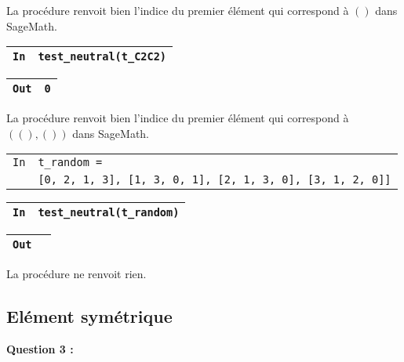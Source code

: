 \documentclass[titlepage]{article}
\begin{document}
        La procédure renvoit bien l'indice du premier élément qui correspond à $()$ dans SageMath.\\

        \begin{tabularx}{11.5cm}{|p{0.60cm}|X|}
            \hline
            \verb|In|
            & 
            \verb|test_neutral(t_C2C2)|
            \\
            \hline
        \end{tabularx}

        \begin{tabularx}{11.5cm}{|p{0.60cm}|X|}
            \hline
            \verb|Out|
            & 
            \verb|0|
            \\
            \hline
        \end{tabularx}
        \newline
        \newline
        La procédure renvoit bien l'indice du premier élément qui correspond à $((), ())$ dans SageMath.
        \newline

        \begin{tabularx}{11.5cm}{|p{0.60cm}|X|}
            \hline
            \verb|In|
            & 
            \verb|t_random = |
            \\
            \verb||
            & 
            \verb|[0, 2, 1, 3], [1, 3, 0, 1], [2, 1, 3, 0], [3, 1, 2, 0]]|
            \\
            \hline
        \end{tabularx}

        \begin{tabularx}{11.5cm}{|p{0.60cm}|X|}
            \hline
            \verb|In|
            & 
            \verb|test_neutral(t_random)|
            \\
            \hline
        \end{tabularx}

        \begin{tabularx}{11.5cm}{|p{0.60cm}|X|}
            \hline
            \verb|Out|
            & 
            \verb||
            \\
            \hline
        \end{tabularx}
        \newline

        La procédure ne renvoit rien.
        \newline
        \subsection{Elément symétrique}
        \textbf{Question 3 :}
\end{document}
